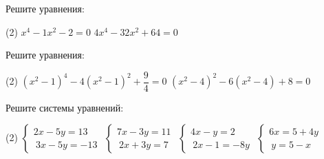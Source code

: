 \begin{homework}[number=2]
	\begin{listofex}
		\item Решите уравнения:
		\begin{tasks}(2)
			\task \( x^{4}-1x^{2}-2=0 \)
			\task \( 4x^{4}-32x^{2}+64=0 \)
		\end{tasks}
		\item Решите уравнения:
		\begin{tasks}(2)
			\task \( (x^{2}-1)^{4}-4(x^{2}-1)^{2}+\dfrac{9}{4}=0 \)
			\task \( (x^{2}-4)^{2}-6(x^{2}-4)+8=0 \)
		\end{tasks}
		\item Решите системы уравнений:
		\begin{tasks}(2)
			\task \( \begin{cases}
				2x-5y=13\\\ 3x-5y=-13
			\end{cases} \)
			\task \( \begin{cases}
				7x-3y=11\\\ 2x+3y=7
			\end{cases} \)
			\task \( \begin{cases}
				4x-y=2\\\ 2x-1=-8y
			\end{cases} \)
			\task \( \begin{cases}
				6x=5+4y\\\ y=5-x
			\end{cases} \)
		\end{tasks}
	\end{listofex}
\end{homework}

